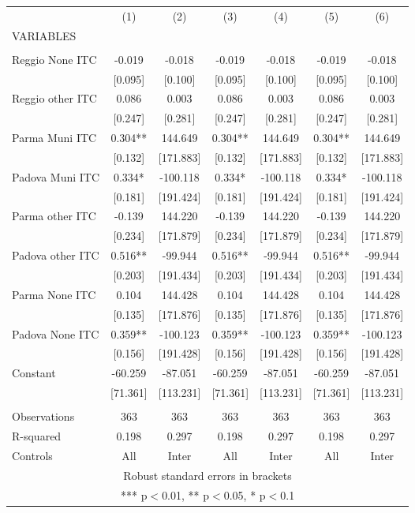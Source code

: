 \begin{tabular}{lcccccc} \hline
 & (1) & (2) & (3) & (4) & (5) & (6) \\
VARIABLES &  &  &  &  &  &  \\ \hline
 &  &  &  &  &  &  \\
Reggio None ITC & -0.019 & -0.018 & -0.019 & -0.018 & -0.019 & -0.018 \\
 & [0.095] & [0.100] & [0.095] & [0.100] & [0.095] & [0.100] \\
Reggio other ITC & 0.086 & 0.003 & 0.086 & 0.003 & 0.086 & 0.003 \\
 & [0.247] & [0.281] & [0.247] & [0.281] & [0.247] & [0.281] \\
Parma Muni ITC & 0.304** & 144.649 & 0.304** & 144.649 & 0.304** & 144.649 \\
 & [0.132] & [171.883] & [0.132] & [171.883] & [0.132] & [171.883] \\
Padova Muni ITC & 0.334* & -100.118 & 0.334* & -100.118 & 0.334* & -100.118 \\
 & [0.181] & [191.424] & [0.181] & [191.424] & [0.181] & [191.424] \\
Parma other ITC & -0.139 & 144.220 & -0.139 & 144.220 & -0.139 & 144.220 \\
 & [0.234] & [171.879] & [0.234] & [171.879] & [0.234] & [171.879] \\
Padova other ITC & 0.516** & -99.944 & 0.516** & -99.944 & 0.516** & -99.944 \\
 & [0.203] & [191.434] & [0.203] & [191.434] & [0.203] & [191.434] \\
Parma None ITC & 0.104 & 144.428 & 0.104 & 144.428 & 0.104 & 144.428 \\
 & [0.135] & [171.876] & [0.135] & [171.876] & [0.135] & [171.876] \\
Padova None ITC & 0.359** & -100.123 & 0.359** & -100.123 & 0.359** & -100.123 \\
 & [0.156] & [191.428] & [0.156] & [191.428] & [0.156] & [191.428] \\
Constant & -60.259 & -87.051 & -60.259 & -87.051 & -60.259 & -87.051 \\
 & [71.361] & [113.231] & [71.361] & [113.231] & [71.361] & [113.231] \\
 &  &  &  &  &  &  \\
Observations & 363 & 363 & 363 & 363 & 363 & 363 \\
R-squared & 0.198 & 0.297 & 0.198 & 0.297 & 0.198 & 0.297 \\
 Controls & All & Inter & All & Inter & All & Inter \\ \hline
\multicolumn{7}{c}{ Robust standard errors in brackets} \\
\multicolumn{7}{c}{ *** p$<$0.01, ** p$<$0.05, * p$<$0.1} \\
\end{tabular}
